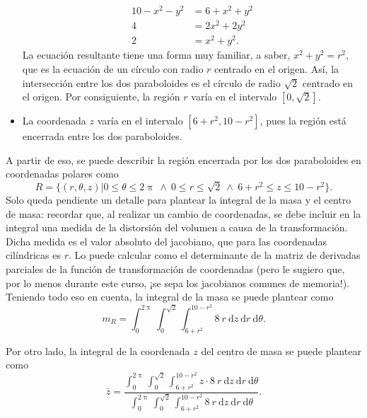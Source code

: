 \documentclass{fmbvecto}
\begin{document}
\begin{problema}
\begin{itemize}
\begin{align*}
        10 - x^2 - y^2 &= 6 + x^2 + y^2 \\
        4 &= 2x^2 + 2y^2 \\
        2 &= x^2 + y^2.
    \end{align*}
    La ecuación resultante tiene una forma muy familiar, a saber, \(x^2+y^2 = r^2\), que es la ecuación de un círculo con radio \(r\) centrado en el origen. Así, la intersección entre los dos paraboloides es el círculo de radio \(\sqrt{2}\) centrado en el origen. Por consiguiente, la región \(r\) varía en el intervalo \([0, \sqrt{2}]\).
    \item La coordenada \(z\) varía en el intervalo \([6 + r^2, 10 - r^2]\), pues la región está encerrada entre los dos paraboloides.
\end{itemize}
A partir de eso, se puede describir la región encerrada por los dos paraboloides en coordenadas polares como
\[R = \{(r, \theta, z) | 0 \leq \theta \leq 2\uppi \ \land \ 0 \leq r \leq \sqrt{2} \ \land \ 6 + r^2 \leq z \leq 10 - r^2\}.\]
Solo queda pendiente un detalle para plantear la integral de la masa y el centro de masa: recordar que, al realizar un cambio de coordenadas, se debe incluir en la integral una medida de la distorsión del volumen a causa de la transformación. Dicha medida es el valor absoluto del jacobiano, que para las coordenadas cilíndricas es \(r\). Lo puede calcular como el determinante de la matriz de derivadas parciales de la función de transformación de coordenadas (pero le sugiero que, por lo menos durante este curso, ¡se sepa los jacobianos comunes de memoria!).\\

Teniendo todo eso en cuenta, la integral de la masa se puede plantear como
\[m_R = \int_{0}^{2\uppi} \int_{0}^{\sqrt{2}} \int_{6 + r^2}^{10 - r^2} 8 \: r \: \mathrm{d}z \: \mathrm{d}r \: \mathrm{d}\theta.\]

Por otro lado, la integral de la coordenada \(z\) del centro de masa se puede plantear como
\[\bar{z} = \frac{\int_{0}^{2\uppi} \int_{0}^{\sqrt{2}} \int_{6 + r^2}^{10 - r^2} z \cdot 8 \: r \: \mathrm{d}z \: \mathrm{d}r \: \mathrm{d}\theta}{\int_{0}^{2\uppi} \int_{0}^{\sqrt{2}} \int_{6 + r^2}^{10 - r^2} 8 \: r \: \mathrm{d}z \: \mathrm{d}r \: \mathrm{d}\theta}.\]


\end{problema}
\end{document}
